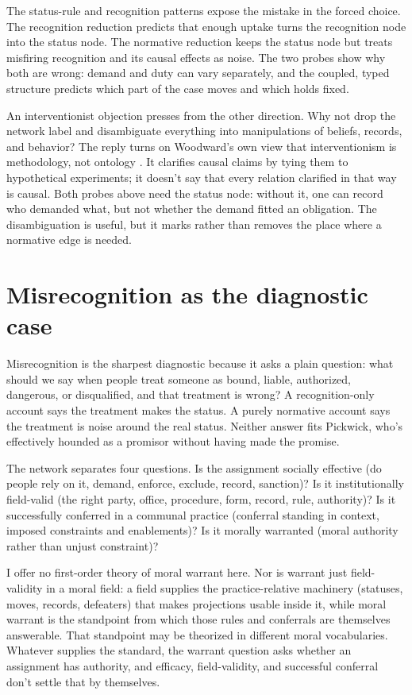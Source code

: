 \documentclass[12pt]{article}
\begin{document}
The status-rule and recognition patterns expose the mistake in the forced choice. The recognition reduction predicts that enough uptake turns the recognition node into the status node. The normative reduction keeps the status node but treats misfiring recognition and its causal effects as noise. The two probes show why both are wrong: demand and duty can vary separately, and the coupled, typed structure predicts which part of the case moves and which holds fixed.

An interventionist objection presses from the other direction. Why not drop the network label and disambiguate everything into manipulations of beliefs, records, and behavior? The reply turns on Woodward's own view that interventionism is methodology, not ontology \citep{woodward2014MethodologyOntology}. It clarifies causal claims by tying them to hypothetical experiments; it doesn't say that every relation clarified in that way is causal. Both probes above need the status node: without it, one can record who demanded what, but not whether the demand fitted an obligation. The disambiguation is useful, but it marks rather than removes the place where a normative edge is needed.

\section{Misrecognition as the diagnostic case}
\label{sec:misrecognition}

Misrecognition is the sharpest diagnostic because it asks a plain question: what should we say when people treat someone as bound, liable, authorized, dangerous, or disqualified, and that treatment is wrong? A recognition-only account says the treatment makes the status. A purely normative account says the treatment is noise around the real status. Neither answer fits Pickwick, who's effectively hounded as a promisor without having made the promise.

The network separates four questions. Is the assignment socially effective (do people rely on it, demand, enforce, exclude, record, sanction)? Is it institutionally field-valid (the right party, office, procedure, form, record, rule, authority)? Is it successfully conferred in a communal practice (conferral standing in context, imposed constraints and enablements)? Is it morally warranted (moral authority rather than unjust constraint)?

I offer no first-order theory of moral warrant here. Nor is warrant just field-validity in a moral field: a field supplies the practice-relative machinery (statuses, moves, records, defeaters) that makes projections usable inside it, while moral warrant is the standpoint from which those rules and conferrals are themselves answerable. That standpoint may be theorized in different moral vocabularies. Whatever supplies the standard, the warrant question asks whether an assignment has authority, and efficacy, field-validity, and successful conferral don't settle that by themselves.
\end{document}
